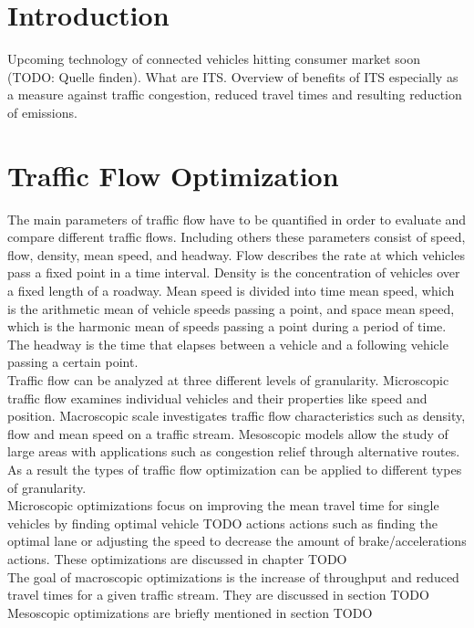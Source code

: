 \documentclass{sig-alternate}
\begin{document}
\date{22 November 2014}

\maketitle
\begin{abstract}

\end{abstract}

\keywords{}

\section{Introduction}
Upcoming technology of connected vehicles hitting consumer market soon (TODO: Quelle finden). What are ITS. Overview of benefits of ITS especially as a measure against traffic congestion, reduced travel times and resulting reduction of emissions.
\section{Traffic Flow Optimization }
The main parameters of traffic flow have to be quantified in order to evaluate and compare different traffic flows. Including others these parameters consist of speed, flow, density, mean speed, and headway. Flow describes the rate at which vehicles pass a fixed point in a time interval. Density is the concentration of vehicles over a fixed length of a roadway. Mean speed is divided into time mean speed, which is the arithmetic mean of vehicle speeds passing a point, and space mean speed, which is the harmonic mean of speeds passing a point during a period of time. The headway is the time that elapses between a vehicle and a following vehicle passing a certain point. \\
Traffic flow can be analyzed at three different levels of granularity. Microscopic traffic flow examines individual vehicles and their properties like speed and position. Macroscopic scale investigates traffic flow characteristics such as density, flow and mean speed on a traffic stream. Mesoscopic models allow the study of large areas with applications such as congestion relief through alternative routes. \\
As a result the types of traffic flow optimization can be applied to different types of granularity. \\
Microscopic optimizations focus on improving the mean travel time for single vehicles by finding optimal vehicle TODO actions actions such as finding the optimal lane or adjusting the speed to decrease the amount of brake/accelerations actions. These optimizations are discussed in chapter TODO\\
The goal of macroscopic optimizations is the increase of throughput and reduced travel times for a given traffic stream. They are discussed in section TODO \\
Mesoscopic optimizations are briefly mentioned in section TODO\\
\end{document}
